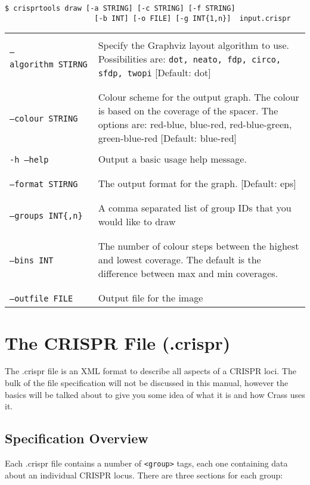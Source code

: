 \documentclass[11pt]{article} %
\newcommand{\optionflag}[1]{\texttt{-#1}}
\newcommand{\optionflagarg}[2]{\optionflag{#1}\ \texttt{#2}}
\newcommand{\longoptionflag}[1]{\texttt{--#1}}
\newcommand{\longoptionflagarg}[2]{\longoptionflag{#1}\ \texttt{#2}}
\newcommand{\combinedoptionflag}[2]{\optionflag{#1}\ \longoptionflag{#2}}
\newcommand{
	\combinedoptionflagarg}[3]{
		\shortstack[l]{
			\optionflagarg{#1}{#3} \\ \longoptionflagarg{#2}{#3}
		}
	}
\begin{document}
\begin{lstlisting}
$ crisprtools draw [-a STRING] [-c STRING] [-f STRING] 
                     [-b INT] [-o FILE] [-g INT{1,n}]  input.crispr
\end{lstlisting}
 \begin{longtable}{  l    p{10cm} }
 \combinedoptionflagarg{a}{algorithm}{STIRNG} & Specify the Graphviz layout algorithm to use.  Possibilities are: \texttt{dot, neato, fdp, circo, sfdp, twopi} [Default: dot] \\ \\
 \combinedoptionflagarg{c}{colour}{STRING} & Colour scheme for the output graph.  The colour is based on the coverage of the spacer.  The options are: red-blue, blue-red, red-blue-green, green-blue-red [Default: blue-red]\\ \\
 \combinedoptionflag{h}{help} & Output a basic usage help message. \\ \\
\combinedoptionflagarg{f}{format}{STIRNG} & The output format for the graph. [Default: eps] \\ \\
\combinedoptionflagarg{g}{groups}{INT\{,n\}} & A comma separated list of group IDs that you would like to draw \\ \\
\combinedoptionflagarg{b}{bins}{INT} & The number of colour steps between the highest and lowest coverage.  The default is the difference between max and min coverages. \\ \\
\combinedoptionflagarg{o}{outfile}{FILE} & Output file for the image \\ 

\end{longtable}

\section{The CRISPR File (.crispr)}
\label{sec:Fileformats}
The .crispr file is an XML format to describe all aspects of a CRISPR loci.  The bulk of the file specification will not be discussed in this manual, however the basics will be talked about to give you some idea of what it is and how Crass uses it.
\subsection{Specification Overview}
Each .crispr file contains a number of \lstinline[language=XML_new]$<group>$ tags, each one containing data about an individual CRISPR locus.  There are three sections for each group:
\end{document}
